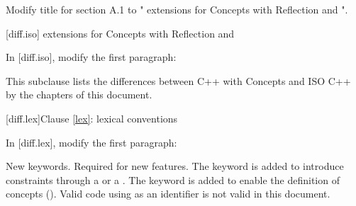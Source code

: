 \setcounter{chapter}{0}

Modify title for section A.1 to "\Cpp{} extensions for Concepts with Reflection
and {\cppstddocno}".

\setcounter{section}{0}
[diff.iso]{\Cpp{} extensions for Concepts with Reflection and {\cppstddocno}}

In {\cppstddocno} [diff.iso], modify the first paragraph:

\begin{std.txt}
This subclause lists the differences between C++ with  Concepts and ISO C++ by the chapters of this document.
\end{std.txt}

[diff.lex]{Clause \ref{lex}: lexical conventions}

In {\cppstddocno} [diff.lex], modify the first paragraph:

\begin{std.txt}
\change New keywords.
\rationale Required for new features.
The  keyword is added
to introduce constraints through a  or
a . The  keyword is
added to enable the definition of concepts ().
\effect
Valid {\cppstddocno} code using \added{,} 
as an identifier is not valid in this document.
\end{std.txt}
